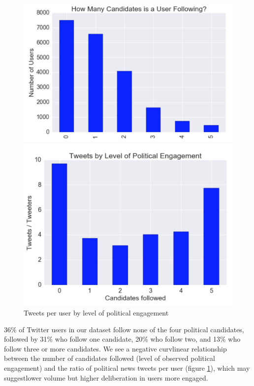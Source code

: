 \documentclass[letterpaper]{article}
\begin{document}
\begin{figure}[t!]  
\centering 
  \includegraphics[width=0.8\columnwidth]{users-vs-engagement}  


  \includegraphics[width=0.8\columnwidth]{tweet-ratio-vs-engagement}  
  \caption{Tweets per user by level of political engagement
    \label{fig:tweet-ratio-engagement}}
\end{figure}

36\% of Twitter users in our dataset follow none of the four political candidates, followed by 31\% who follow one candidate, 20\% who follow two, and 13\% who follow three or more candidates. We see a negative curvlinear relationship between the number of candidates followed (level of observed political engagement) and the ratio of political news tweets per user (figure \ref{fig:tweet-ratio-engagement}), which may suggestlower volume but higher deliberation in users more engaged.
\end{document}
